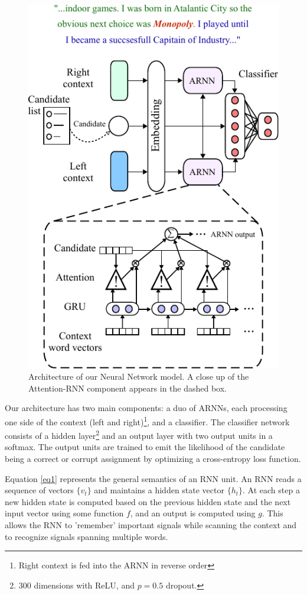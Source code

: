 \documentclass[11pt]{article}
\begin{document}
	\begin{figure}
		\centering
		\includegraphics[scale=0.95]{diagrams/model_color_v4.pdf}
		\caption{Architecture of our Neural Network model. A close up of the Attention-RNN component appears in the dashed box.}
		\label{fig:arnn}
	\end{figure}	
	
	Our architecture has two main components: a duo of ARNNs, each processing one side of the context (left and right)\footnote{Right context is fed into the ARNN in reverse order}, and a classifier. The classifier network consists of a hidden layer\footnote{300 dimensions with ReLU, and $p=0.5$ dropout.} and an output layer with two output units in a softmax. The output units are trained to emit the likelihood of the candidate being a correct or corrupt assignment by optimizing a cross-entropy loss function. 
	
	Equation \ref{eq1} represents the general semantics of an RNN unit. An RNN reads a sequence of vectors $\{v_t\}$ and maintains a hidden state vector $\{h_t\}$. At each step a new hidden state is computed based on the previous hidden state and the next input vector using some function $f$, and an output is computed using $g$. This allows the RNN to 'remember' important signals while scanning the context and to recognize signals spanning multiple words.
	
\end{document}
